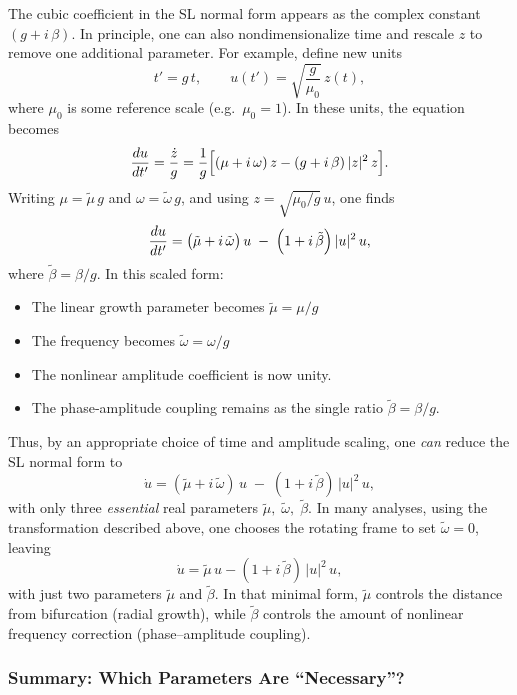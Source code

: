 The cubic coefficient in the SL normal form appears as the complex constant \((g + i\,\beta)\).  In principle, one can also nondimensionalize time and rescale \(z\) to remove one additional parameter.  For example, define new units
\[
t' = g\,t, 
\qquad 
u(t') = \sqrt{\frac{g}{\mu_0}}\,z(t), 
\]
where \(\mu_0\) is some reference scale (e.g.\ \(\mu_0=1\)).  In these units, the equation becomes
\[
\frac{d u}{d t'} 
= \frac{\dot z}{g} 
= \frac{1}{g}\Bigl[(\mu + i\,\omega)\,z - (g + i\,\beta)\,\lvert z\rvert^2\,z\Bigr]. 
\]
Writing \(\mu = \tilde\mu\,g\) and \(\omega = \tilde\omega\,g\), and using \(z = \sqrt{\mu_0/g}\,u\), one finds
\[
\frac{d u}{d t'} 
= \bigl(\tilde\mu + i\,\tilde\omega\bigr)\,u 
\;-\; \Bigl(1 + i\,\tilde\beta\Bigr)\,\lvert u\rvert^2\,u,
\]
where \(\tilde\beta = \beta/g\).  In this scaled form:
\begin{itemize}
    \item The linear growth parameter becomes \(\tilde\mu=\mu/g\)
    \item The frequency becomes \(\tilde\omega=\omega/g\)
    \item The nonlinear amplitude coefficient is now unity.
    \item The phase‐amplitude coupling remains as the single ratio \(\tilde\beta = \beta/g\). 
\end{itemize}
Thus, by an appropriate choice of time and amplitude scaling, one \emph{can} reduce the SL normal form to
\[
\dot u 
= (\tilde\mu + i\,\tilde\omega)\,u 
\;-\; (1 + i\,\tilde\beta)\,\lvert u\rvert^2\,u,
\]
with only three \emph{essential} real parameters \(\tilde\mu,\;\tilde\omega,\;\tilde\beta\).  In many analyses, using the transformation described above, one chooses the rotating frame to set \(\tilde\omega=0\), leaving 
\[
\dot u 
= \tilde\mu\,u - (1 + i\,\tilde\beta)\,\lvert u\rvert^2\,u,
\]
with just two parameters \(\tilde\mu\) and \(\tilde\beta\).  In that minimal form,  \(\tilde\mu\) controls the distance from bifurcation (radial growth), while   
 \(\tilde\beta\) controls the amount of nonlinear frequency correction (phase–amplitude coupling).  

\subsubsection{Summary: Which Parameters Are ``Necessary''?}


